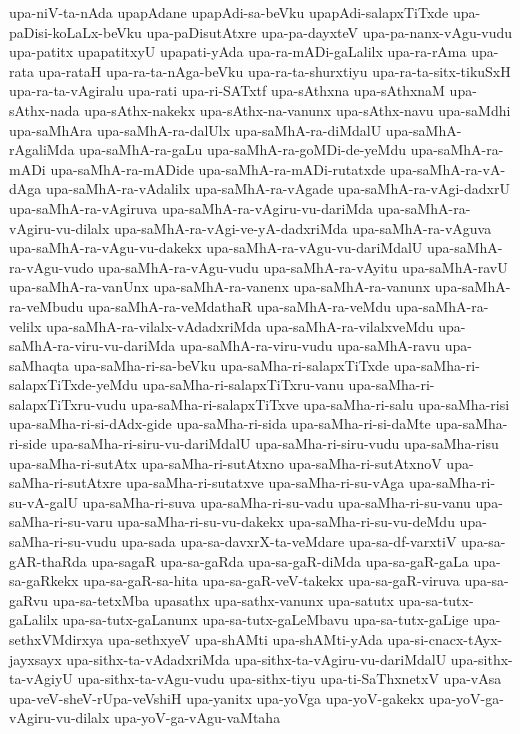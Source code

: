 {upa-niV-ta-nAda
upapAdane
upapAdi-sa-beVku
upapAdi-salapxTiTxde
upa-paDisi-koLaLx-beVku
upa-paDisutAtxre
upa-pa-dayxteV
upa-pa-nanx-vAgu-vudu
upa-patitx
upapatitxyU
upapati-yAda
upa-ra-mADi-gaLalilx
upa-ra-rAma
upa-rata
upa-rataH
upa-ra-ta-nAga-beVku
upa-ra-ta-shurxtiyu
upa-ra-ta-sitx-tikuSxH
upa-ra-ta-vAgiralu
upa-rati
upa-ri-SATxtf
upa-sAthxna
upa-sAthxnaM
upa-sAthx-nada
upa-sAthx-nakekx
upa-sAthx-na-vanunx
upa-sAthx-navu
upa-saMdhi
upa-saMhAra
upa-saMhA-ra-dalUlx
upa-saMhA-ra-diMdalU
upa-saMhA-rAgaliMda
upa-saMhA-ra-gaLu
upa-saMhA-ra-goMDi-de-yeMdu
upa-saMhA-ra-mADi
upa-saMhA-ra-mADide
upa-saMhA-ra-mADi-rutatxde
upa-saMhA-ra-vA-dAga
upa-saMhA-ra-vAdalilx
upa-saMhA-ra-vAgade
upa-saMhA-ra-vAgi-dadxrU
upa-saMhA-ra-vAgiruva
upa-saMhA-ra-vAgiru-vu-dariMda
upa-saMhA-ra-vAgiru-vu-dilalx
upa-saMhA-ra-vAgi-ve-yA-dadxriMda
upa-saMhA-ra-vAguva
upa-saMhA-ra-vAgu-vu-dakekx
upa-saMhA-ra-vAgu-vu-dariMdalU
upa-saMhA-ra-vAgu-vudo
upa-saMhA-ra-vAgu-vudu
upa-saMhA-ra-vAyitu
upa-saMhA-ravU
upa-saMhA-ra-vanUnx
upa-saMhA-ra-vanenx
upa-saMhA-ra-vanunx
upa-saMhA-ra-veMbudu
upa-saMhA-ra-veMdathaR
upa-saMhA-ra-veMdu
upa-saMhA-ra-velilx
upa-saMhA-ra-vilalx-vAdadxriMda
upa-saMhA-ra-vilalxveMdu
upa-saMhA-ra-viru-vu-dariMda
upa-saMhA-ra-viru-vudu
upa-saMhA-ravu
upa-saMhaqta
upa-saMha-ri-sa-beVku
upa-saMha-ri-salapxTiTxde
upa-saMha-ri-salapxTiTxde-yeMdu
upa-saMha-ri-salapxTiTxru-vanu
upa-saMha-ri-salapxTiTxru-vudu
upa-saMha-ri-salapxTiTxve
upa-saMha-ri-salu
upa-saMha-risi
upa-saMha-ri-si-dAdx-gide
upa-saMha-ri-sida
upa-saMha-ri-si-daMte
upa-saMha-ri-side
upa-saMha-ri-siru-vu-dariMdalU
upa-saMha-ri-siru-vudu
upa-saMha-risu
upa-saMha-ri-sutAtx
upa-saMha-ri-sutAtxno
upa-saMha-ri-sutAtxnoV
upa-saMha-ri-sutAtxre
upa-saMha-ri-sutatxve
upa-saMha-ri-su-vAga
upa-saMha-ri-su-vA-galU
upa-saMha-ri-suva
upa-saMha-ri-su-vadu
upa-saMha-ri-su-vanu
upa-saMha-ri-su-varu
upa-saMha-ri-su-vu-dakekx
upa-saMha-ri-su-vu-deMdu
upa-saMha-ri-su-vudu
upa-sada
upa-sa-davxrX-ta-veMdare
upa-sa-df-varxtiV
upa-sa-gAR-thaRda
upa-sagaR
upa-sa-gaRda
upa-sa-gaR-diMda
upa-sa-gaR-gaLa
upa-sa-gaRkekx
upa-sa-gaR-sa-hita
upa-sa-gaR-veV-takekx
upa-sa-gaR-viruva
upa-sa-gaRvu
upa-sa-tetxMba
upasathx
upa-sathx-vanunx
upa-satutx
upa-sa-tutx-gaLalilx
upa-sa-tutx-gaLanunx
upa-sa-tutx-gaLeMbavu
upa-sa-tutx-gaLige
upa-sethxVMdirxya
upa-sethxyeV
upa-shAMti
upa-shAMti-yAda
upa-si-cnacx-tAyx-jayxsayx
upa-sithx-ta-vAdadxriMda
upa-sithx-ta-vAgiru-vu-dariMdalU
upa-sithx-ta-vAgiyU
upa-sithx-ta-vAgu-vudu
upa-sithx-tiyu
upa-ti-SaThxnetxV
upa-vAsa
upa-veV-sheV-rUpa-veVshiH
upa-yanitx
upa-yoVga
upa-yoV-gakekx
upa-yoV-ga-vAgiru-vu-dilalx
upa-yoV-ga-vAgu-vaMtaha
}
